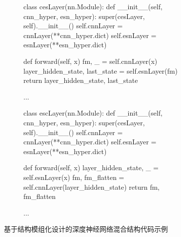\begin{figure}[t!]

    \begin{subfigure}{\textwidth}
        \begin{python}
            class cesLayer(nn.Module):
                def __init__(self, cnn_hyper, esn_hyper):
                    super(cesLayer, self).__init__()
                    self.cnnLayer = cnnLayer(**cnn_hyper.dict)
                    self.esnLayer = esnLayer(**esn_hyper.dict)

                def forward(self, x)
                    fm, _ = self.cnnLayer(x)
                    layer_hidden_state, last_state = self.esnLayer(fm)        
                    return layer_hidden_state, last_state
    
                ...
        \end{python}


    \end{subfigure}

    \begin{subfigure}{\textwidth}
        \begin{python}
            class escLayer(nn.Module):
                def __init__(self, cnn_hyper, esn_hyper):
                    super(cesLayer, self).__init__()
                    self.cnnLayer = cnnLayer(**cnn_hyper.dict)
                    self.esnLayer = esnLayer(**esn_hyper.dict)

                def forward(self, x)
                    layer_hidden_state, _ = self.esnLayer(x)
                    fm, fm_flatten = self.cnnLayer(layer_hidden_state)
                    return fm, fm_flatten
    
                ...
        \end{python}


    \end{subfigure}

    \caption{基于结构模组化设计的深度神经网络混合结构代码示例\label{fig:ch.univ.mix}} 
\end{figure}


